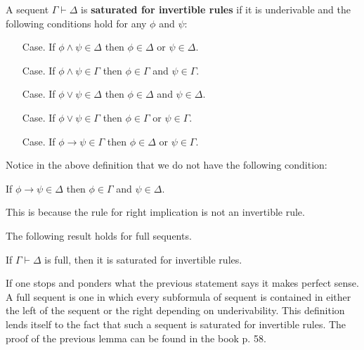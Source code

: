 \documentclass{article}
\begin{document}
\begin{definition}
  \label{def:sat_for_invert_rules}
  A sequent $\Gamma \vdash \Delta$ is \textbf{saturated for invertible rules} if it is
  underivable and the following conditions hold for any $\phi$ and $\psi$:
    \begin{itemize}
    \item[Case.] If $\phi \land \psi \in \Delta$ then $\phi \in \Delta$ or $\psi \in \Delta$.
    \item[Case.] If $\phi \land \psi \in \Gamma$ then $\phi \in \Gamma$ and $\psi \in \Gamma$.
    \item[Case.] If $\phi \lor \psi \in \Delta$ then $\phi \in \Delta$ and $\psi \in \Delta$.
    \item[Case.] If $\phi \lor \psi \in \Gamma$ then $\phi \in \Gamma$ or $\psi \in \Gamma$.      
    \item[Case.] If $\phi \to \psi \in \Gamma$ then $\phi \in \Delta$ or $\psi \in \Gamma$.      
    \end{itemize}    
\end{definition}
\noindent
Notice in the above definition that we do not have the following condition:
\begin{center}
  If $\phi \to \psi \in \Delta$ then $\phi \in \Gamma$ and $\psi \in \Delta$.      
\end{center}
This is because the rule for right implication is not an invertible rule.  

\noindent
The following result holds for full sequents.
\begin{lemma}[Saturation]
  \label{lemma:saturation}
  If $\Gamma \vdash \Delta$ is full, then it is saturated for invertible rules.
\end{lemma}
If one stops and ponders what the previous statement says it makes perfect sense.  A full
sequent is one in which every subformula of sequent is contained in either the left of the
sequent or the right depending on underivability. This definition lends itself to the 
fact that such a sequent is saturated for invertible rules.  The proof of the previous
lemma can be found in the book p. 58.
\end{document}
